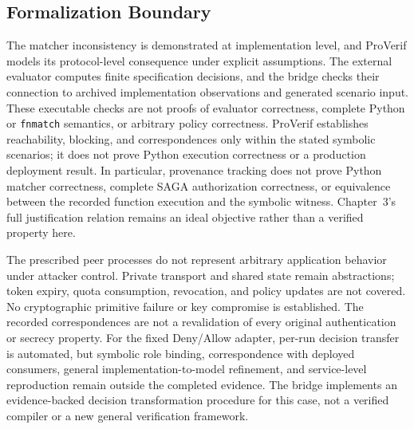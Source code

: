 
\subsection{Formalization Boundary}

The matcher inconsistency is demonstrated at implementation level, and
ProVerif models its protocol-level consequence under explicit assumptions.
The external evaluator computes finite specification decisions, and the bridge
checks their connection to archived implementation observations and generated
scenario input. These executable checks are not proofs of evaluator correctness,
complete Python or \texttt{fnmatch} semantics, or arbitrary policy correctness.
ProVerif establishes reachability, blocking, and correspondences only within
the stated symbolic scenarios; it does not prove Python execution correctness
or a production deployment result.
In particular, provenance tracking does not prove Python matcher correctness,
complete SAGA authorization correctness, or equivalence between the recorded
function execution and the symbolic witness. Chapter~3's full justification
relation remains an ideal objective rather than a verified property here.

The prescribed peer processes do not represent arbitrary application behavior
under attacker control. Private transport and shared state remain abstractions;
token expiry, quota consumption, revocation, and policy updates are not
covered. No cryptographic primitive failure or key compromise is established.
The recorded correspondences are not a revalidation of every original
authentication or secrecy property. For the fixed Deny/Allow adapter,
per-run decision transfer is automated, but symbolic role binding, correspondence with
deployed consumers, general implementation-to-model refinement, and
service-level reproduction remain outside the completed evidence. The bridge
implements an evidence-backed decision transformation procedure for this case,
not a verified compiler or a new general verification framework.
